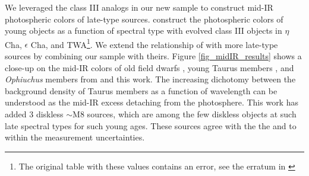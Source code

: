 We leveraged the class III analogs in our new sample to construct mid-IR photospheric colors of late-type sources.  \citet{2010ApJS..186..111L} construct the photospheric colors of young objects as a function of spectral type with evolved class III objects in $\eta$ Cha, $\epsilon$ Cha, and TWA\footnote{The original table with these values contains an error, see the erratum in \cite{2010ApJS..189..353L}}.  We extend the relationship of \citet{2010ApJS..186..111L} with more late-type sources by combining our sample with theirs.  Figure \ref{fig_midIR_results} shows a close-up on the mid-IR colors of old field dwarfs \citep{2006ApJ...651..502P}, young Taurus members \citep{2010ApJS..186..111L}, and \emph{Ophiuchus} members from \citep{allers06} and this work.  The increasing dichotomy between the background density of Taurus members as a function of wavelength can be understood as the mid-IR excess detaching from the photosphere.  This work has added 3 diskless $\sim$M8 sources, which are among the few diskless objects at such late spectral types for such young ages.  These sources agree with the the \citet{2006ApJ...651..502P} and \citep{2010ApJS..186..111L} to within the measurement uncertainties.


